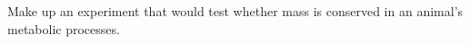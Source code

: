         Make up an experiment that would test whether mass is conserved in an
        animal's metabolic processes.
